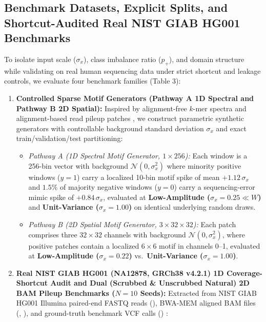 \documentclass[11pt, a4paper]{article}
\begin{document}
\subsection{Benchmark Datasets, Explicit Splits, and Shortcut-Audited Real NIST GIAB HG001 Benchmarks}
To isolate input scale ($\sigma_{x}$), class imbalance ratio ($p_{+}$), and domain structure while validating on real human sequencing data under strict shortcut and leakage controls, we evaluate four benchmark families (Table 3):

\begin{enumerate}
    \item \textbf{Controlled Sparse Motif Generators (Pathway A 1D Spectral and Pathway B 2D Spatial):} Inspired by alignment-free $k$-mer spectra and alignment-based read pileup patches \cite{ref1, ref6, ref35}, we construct parametric synthetic generators with controllable background standard deviation $\sigma_{x}$ and exact train/validation/test partitioning:
    \begin{itemize}
        \item \textit{Pathway A (1D Spectral Motif Generator, $1 \times 256$):} Each window is a 256-bin vector with background $\mathcal{N}(0, \sigma_{x}^{2})$ where minority positive windows ($y=1$) carry a localized 10-bin motif spike of mean $+1.12\,\sigma_{x}$ and $1.5\%$ of majority negative windows ($y=0$) carry a sequencing-error mimic spike of $+0.84\,\sigma_{x}$, evaluated at \textbf{Low-Amplitude ($\sigma_{x} = 0.25 \ll W$)} and \textbf{Unit-Variance ($\sigma_{x} = 1.00$)} on identical underlying random draws.
        \item \textit{Pathway B (2D Spatial Motif Generator, $3 \times 32 \times 32$):} Each patch comprises three $32 \times 32$ channels with background $\mathcal{N}(0, \sigma_{x}^{2})$, where positive patches contain a localized $6 \times 6$ motif in channels 0--1, evaluated at \textbf{Low-Amplitude ($\sigma_{x} = 0.22$)} vs.\ \textbf{Unit-Variance ($\sigma_{x} = 1.00$)}.
    \end{itemize}
    \item \textbf{Real NIST GIAB HG001 (NA12878, GRCh38 v4.2.1) 1D Coverage-Shortcut Audit and Dual (Scrubbed \& Unscrubbed Natural) 2D BAM Pileup Benchmarks ($N=10$ Seeds):} Extracted from NIST GIAB HG001 Illumina paired-end FASTQ reads (), BWA-MEM aligned BAM files (, ), and ground-truth benchmark VCF calls () \cite{ref4, ref5, ref6, ref7}:

\end{enumerate}
\end{document}
